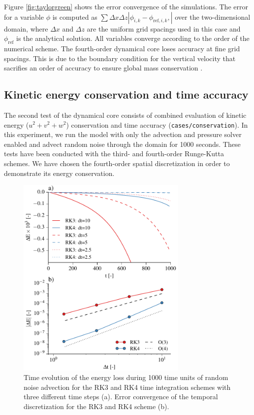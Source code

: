 \documentclass[gmd,manuscript]{copernicus}
\begin{document}
Figure \ref{fig:taylorgreen} shows the error convergence of the simulations. The error for a variable $\phi$ is computed as $\sum \Delta x \Delta z \left| \phi_{i,k} - \phi_{\textrm{ref},i,k}, \right|$ over the two-dimensional domain, where $\Delta x$ and $\Delta z$ are the uniform grid spacings used in this case and $\phi_{\textrm{ref}}$ is the analytical solution. All variables converge according to the order of the numerical scheme. The fourth-order dynamical core loses accuracy at fine grid spacings. This is due to the boundary condition for the vertical velocity that sacrifies an order of accuracy to ensure global mass conservation \citep{Morinishi1998}.

\subsection{Kinetic energy conservation and time accuracy} \label{sec:validationtime}
The second test of the dynamical core consists of combined evaluation of kinetic energy ($u^2 + v^2 + w^2$) conservation and time accuracy 
(\texttt{cases/conservation}). In this experiment, we run the model with only the advection and pressure solver enabled and advect random noise through the domain for 1000 seconds. These tests have been conducted with the third- and fourth-order Runge-Kutta schemes. We have chosen the fourth-order spatial discretization in order to demonstrate its energy conservation.
\begin{figure}[t]
\vspace*{2mm}
\begin{center}
\includegraphics[width=8.3cm]{figs/timeconvergence.pdf}
\end{center}
\caption{Time evolution of the energy loss during 1000 time units of random noise advection for the RK3 and RK4 time integration schemes with three different time steps (a). Error convergence of the temporal discretization for the RK3 and RK4 scheme (b).}\label{fig:timeconvergence}
\end{figure}
\end{document}
